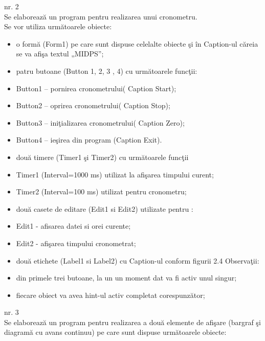	\item[Task-ul] nr. 2
\\  Se  elaborează  un program pentru realizarea unui cronometru.
\\Se vor utiliza următoarele obiecte:
\begin{itemize}
\item    o formă (Form1) pe care sunt dispuse celelalte obiecte şi în Caption-ul căreia se va afişa textul „MIDPS”;
\item	patru butoane (Button 1, 2, 3 , 4) cu următoarele funcţii: 
\item	Button1 – pornirea cronometrului( Caption Start);
\item	Button2 – oprirea cronometrului( Caption Stop);
\item	Button3 – iniţializarea cronometrului( Caption Zero);
\item	Button4 – ieşirea din program (Caption Exit).
\item	două timere (Timer1 şi Timer2)  cu următoarele funcţii
\item	Timer1 (Interval=1000 ms) utilizat la afişarea timpului curent;
\item	Timer2 (Interval=100 ms) utilizat pentru cronometru;
\item	două casete de editare (Edit1 si Edit2) utilizate pentru :
\item	Edit1 - afisarea datei si orei curente;
\item	Edit2 - afişarea timpului cronometrat;
\item	două etichete (Label1 si Label2) cu Caption-ul conform figurii 2.4
Observaţii: 
	\item	din primele trei butoane, la un un moment dat va fi  activ unul singur;
\item	fiecare obiect va avea hint-ul activ completat corespunzător;
\end{itemize}
	\item[Task-ul] nr. 3 
\\Se  elaborează  un program pentru realizarea a două elemente de afişare (bargraf şi diagramă cu avans continuu) pe care sunt dispuse următoarele obiecte:
